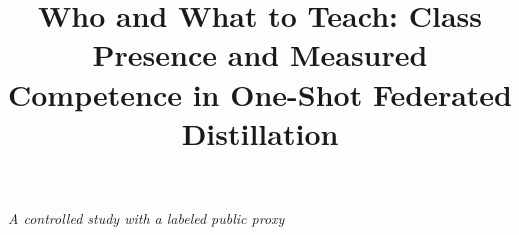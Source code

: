 \documentclass[11pt,a4paper]{article}
\title{Who and What to Teach: Class Presence and Measured Competence in One-Shot Federated Distillation}
\author{}
\date{}
\begin{document}
\maketitle
\begin{center}\textit{A controlled study with a labeled public proxy}\end{center}
\begin{abstract}

\end{abstract}







\clearpage


\end{document}
